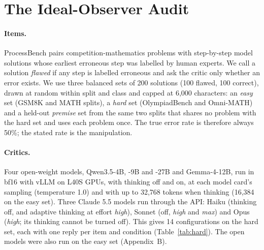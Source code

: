 \documentclass[letterpaper]{article} %
\begin{document}
\section{The Ideal-Observer Audit}
\label{sec:method}

\paragraph{Items.} ProcessBench \citep{zheng2025processbench} pairs competition-mathematics problems with step-by-step model solutions whose earliest erroneous step was labelled by human experts. We call a solution \emph{flawed} if any step is labelled erroneous and ask the critic only whether an error exists. We use three balanced sets of 200 solutions (100 flawed, 100 correct), drawn at random within split and class and capped at 6,000 characters: an \emph{easy} set (GSM8K and MATH splits), a \emph{hard} set (OlympiadBench and Omni-MATH) and a held-out \emph{premise} set from the same two splits that shares no problem with the hard set and uses each problem once. The true error rate is therefore always 50\%; the stated rate is the manipulation.

\paragraph{Critics.} Four open-weight models, Qwen3.5-4B, -9B and -27B and Gemma-4-12B, run in bf16 with vLLM on L40S GPUs, with thinking off and on, at each model card's sampling (temperature 1.0) and with up to 32,768 tokens when thinking (16,384 on the easy set). Three Claude 5.5 models run through the API: Haiku (thinking off, and adaptive thinking at effort \emph{high}), Sonnet (off, \emph{high} and \emph{max}) and Opus (\emph{high}; its thinking cannot be turned off). This gives 14 configurations on the hard set, each with one reply per item and condition (Table~\ref{tab:hard}). The open models were also run on the easy set (Appendix~B).
\end{document}
